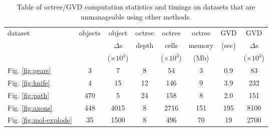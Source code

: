 \documentclass{egpubl}
\begin{document}

\begin{table*}
  \centering
  \footnotesize{
  \begin{tabular}{l c c c c c c c}
    \toprule
    dataset & objects & object          & octree   & octree          & octree &
    GVD   & GVD             \\
            &         & $\Delta$s       & depth    & cells           & memory &
    (sec) & $\Delta$s       \\
            &         & ($\times 10^3$) &          & ($\times 10^3$) & (Mb)   &
          & ($\times 10^3$) \\
    \midrule
    Fig. \ref{fig:gears} & 3 & 7 & 8 & 54 & 3 & 0.9 & 83\\
    Fig. \ref{fig:knife} & 4 & 15 & 12 & 146 & 9 & 3.9 & 232 \\
    Fig. \ref{fig:path} & 470 & 5 & 24 & 158 & 8 & 2.0 & 151 \\
    Fig. \ref{fig:axons} & 448 & 4015 & 8 & 2716 & 151 & 195 & 8100 \\
    Fig. \ref{fig:mol-explode} & 35 & 1500 & 8 & 496 & 70 & 19 & 2700 \\
    \bottomrule
  \end{tabular}}
  \caption{Table of octree/GVD computation statistics and timings on datasets that are unmanageable using other methods. }
  \label{tab:timings}
\end{table*}
\end{document}
